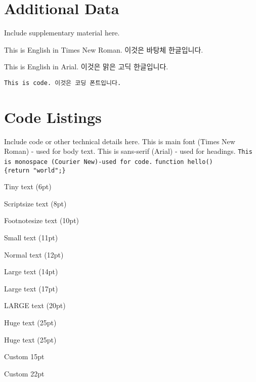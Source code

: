 \appendix	

\chapter{Additional Data}

Include supplementary material here. 

This is English in Times New Roman. 이것은 바탕체 한글입니다.

\textsf{This is English in Arial. 이것은 맑은 고딕 한글입니다.}

\texttt{This is code. 이것은 코딩 폰트입니다.}

\chapter{Code Listings}

Include code or other technical details here. This is main font (Times New Roman) - used for body text.
\textsf{This is sans-serif (Arial) - used for headings.}	
\texttt{This is monospace (Courier New)-used for code.}	
\texttt{function hello()\\\{return "world";\}}

{\tiny Tiny text (6pt)}

{\scriptsize Scriptsize text (8pt)}

{\footnotesize Footnotesize text (10pt)}

{\small Small text (11pt)}

\normalsize Normal text (12pt)

{\large Large text (14pt)}

{\Large Large text (17pt)}

{\LARGE LARGE text (20pt)}

{\huge Huge text (25pt)}

{\Huge Huge text (25pt)}

{\fontsize{15pt}{18pt}\selectfont Custom 15pt}

{\fontsize{22pt}{26pt}\selectfont Custom 22pt}

